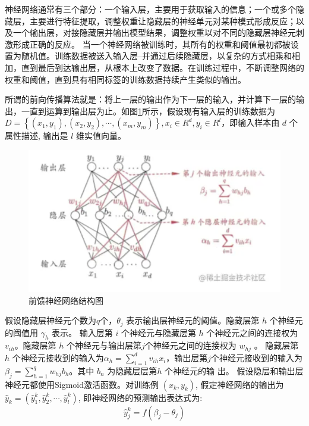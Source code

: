 神经网络通常有三个部分：一个输入层，主要用于获取输入的信息；一个或多个隐藏层，主要进行特征提取，调整权重让隐藏层的神经单元对某种模式形成反应；以及一个输出层，对接隐藏层并输出模型结果，调整权重以对不同的隐藏层神经元刺激形成正确的反应。
当一个神经网络被训练时，其所有的权重和阈值最初都被设置为随机值。训练数据被送入输入层--并通过后续隐藏层，以复杂的方式相乘和相加，直到最后到达输出层，从根本上改变了数据。在训练过程中，不断调整网络的权重和阈值，直到具有相同标签的训练数据持续产生类似的输出。

所谓的前向传播算法就是：将上一层的输出作为下一层的输入，并计算下一层的输出，一直到运算到输出层为止。如图\ref{fig:前馈神经网络结构图}所示，假设现有输入层的训练数据为$D=\left\{\left(x_{1}, y_{1}\right),\left(x_{2}, y_{2}\right), \cdots,\left(x_{m}, y_{m}\right)\right\}, x_{i} \in R^{d}, y_{i} \in R^{l}$，即输入样本由 $d$ 个属性描述, 输出是 $l$ 维实值向量。

\begin{figure}[!hbt]
\centering
	\includegraphics[scale=0.7]{fig2/C2/前馈神经网络}%
	\caption{前馈神经网络结构图}
	\label{fig:前馈神经网络结构图}	
\end{figure}

假设隐藏层神经元个数为$q$个，$\theta_{j}$ 表示输出层神经元的阈值。隐藏层第 $h$ 个神经元的阈值用 $\gamma_{h}$ 表示。
输入层第 $i$ 个神经元与隐藏层第 $h$ 个神经元之间的连接权为 $v_{i h}$。隐藏层第 $h$ 个神经元与输出层第$j$个神经元之间的连接权为 $w_{h j}$ 。
隐藏层第 $h$ 个神经元接收到的输入为$\alpha_{h}=\sum_{i=1}^{d} v_{i h} x_{i}$，输出层第$j$个神经元接收到的输入为$\beta_{j}=\sum_{h=1}^{q} w_{h j} b_{h}$。其中 $b_{n}$ 为隐藏层层第$h$ 个神经元的输 出。
假设隐层和输出层神经元都使用Sigmoid激活函数。对训练例 $\left(x_{k}, y_{k}\right)$, 假定神经网络的输出为 $\hat{y}_{k}=\left(\hat{y}_{1}^{k}, \hat{y}_{2}^{k}, \cdots, \hat{y}_{l}^{k}\right)$, 即神经网络的预测输出表达式为:
\begin{equation}\label{神经网络预测输出}
\hat{y}_{j}^{k}=f\left(\beta_{j}-\theta_{j}\right)
\end{equation}

